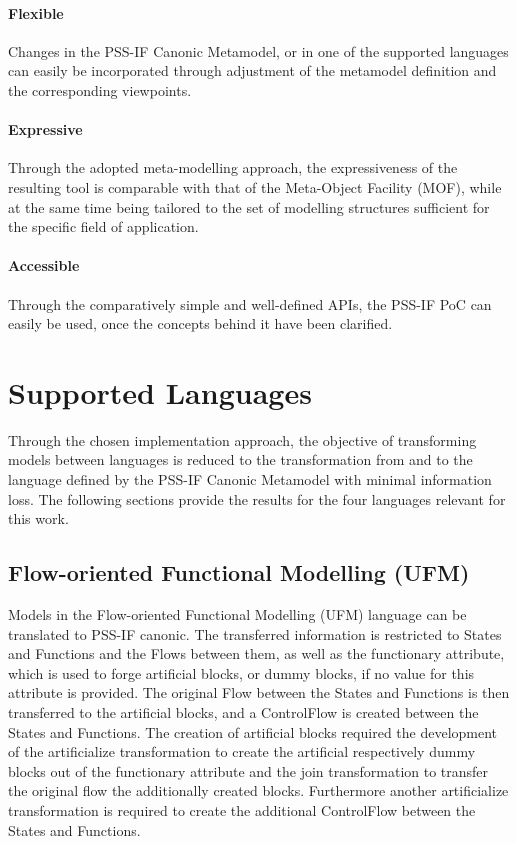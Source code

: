 \paragraph{Flexible} Changes in the PSS-IF Canonic Metamodel, or in one of the supported languages can easily be incorporated through adjustment of the metamodel definition and the corresponding viewpoints.

\paragraph{Expressive} Through the adopted meta-modelling approach, the expressiveness of the resulting tool is comparable with that of the Meta-Object Facility (MOF), while at the same time being tailored to the set of modelling structures sufficient for the specific field of application.

\paragraph{Accessible} Through the comparatively simple and well-defined APIs, the PSS-IF PoC can easily be used, once the concepts behind it have been clarified.

\section{Supported Languages}
\label{sec:results:languages}

Through the chosen implementation approach, the objective of transforming models between languages is reduced to the transformation from and to the language defined by the PSS-IF Canonic Metamodel with minimal information loss. The following sections provide the results for the four languages relevant for this work.

\subsection{Flow-oriented Functional Modelling (UFM)}

Models in the Flow-oriented Functional Modelling (UFM) language can be translated to PSS-IF canonic. The transferred information is restricted to States and Functions and the Flows between them, as well as the functionary attribute, which is used to forge artificial blocks, or dummy blocks, if no value for this attribute is provided. The original Flow between the States and Functions is then transferred to the artificial blocks, and a ControlFlow is created between the States and Functions. The creation of artificial blocks required the development of the artificialize transformation to create the artificial respectively dummy blocks out of the functionary attribute and the join transformation to transfer the original flow the additionally created blocks. Furthermore another artificialize transformation is required to create the additional ControlFlow between the States and Functions.

